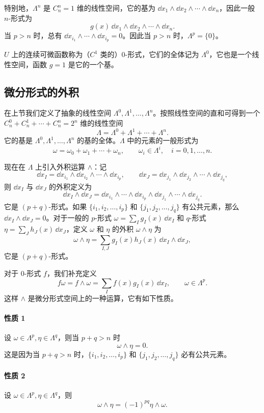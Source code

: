 特别地，$\Lambda^n$ 是 $C_n^n=1$ 维的线性空间，它的基为 $\dd x_1\wedge\dd x_2\wedge\cdots\wedge\dd x_n$，因此一般 $n$-形式为
\[
  g(x)\,\dd x_1\wedge\dd x_2\wedge\cdots\wedge\dd x_n.
\]
当 $p>n$ 时，总有 $\dd x_{i_1}\wedge\cdots\wedge\dd x_{i_p}=0$。因此当 $p>n$ 时，$\Lambda^p=\{0\}$。

$U$ 上的连续可微函数称为（$C^1$ 类的）0-形式，它们的全体记为 $\Lambda^0$，它也是一个线性空间，函数 $g=1$ 是它的一个基。

\subsection{微分形式的外积}

在上节我们定义了抽象的线性空间 $\Lambda^0,\Lambda^1,\ldots,\Lambda^n$。按照线性空间的直和可得到一个 $C_n^0+C_n^1+\cdots+C_n^n=2^n$ 维的线性空间
\[
  \Lambda=\Lambda^0+\Lambda^1+\cdots+\Lambda^n.
\]
它的基是 $\Lambda^0,\Lambda^1,\ldots,\Lambda^n$ 的基的全体。$\Lambda$ 中的元素的一般形式为
\[
  \omega=\omega_0+\omega_1+\cdots+\omega_n,
  \qquad \omega_i\in\Lambda^i,\quad i=0,1,\ldots,n.
\]

现在在 $\Lambda$ 上引入外积运算 $\wedge$：记
\[
  \dd x_I=\dd x_{i_1}\wedge\dd x_{i_2}\wedge\cdots\wedge\dd x_{i_p},\qquad
  \dd x_J=\dd x_{j_1}\wedge\dd x_{j_2}\wedge\cdots\wedge\dd x_{j_q},
\]
则 $\dd x_I$ 与 $\dd x_J$ 的外积定义为
\[
  \dd x_I\wedge\dd x_J
  =\dd x_{i_1}\wedge\cdots\wedge\dd x_{i_p}\wedge
  \dd x_{j_1}\wedge\cdots\wedge\dd x_{j_q}.
\]
它是 $(p+q)$-形式。如果 $\{i_1,i_2,\ldots,i_p\}$ 和 $\{j_1,j_2,\ldots,j_q\}$ 有公共元素，那么 $\dd x_I\wedge\dd x_J=0$。对于一般的 $p$-形式 $\omega=\sum_Ig_I(x)\,\dd x_I$ 和 $q$-形式 $\eta=\sum_Jh_J(x)\,\dd x_J$，定义 $\omega$ 和 $\eta$ 的外积 $\omega\wedge\eta$ 为
\[
  \omega\wedge\eta=\sum_{I,J}g_I(x)h_J(x)\,\dd x_I\wedge\dd x_J,
\]
它是 $(p+q)$-形式。

对于 0-形式 $f$，我们补充定义
\[
  f\omega=f\wedge\omega=\sum_I f(x)g_I(x)\,\dd x_I,\qquad\omega\in\Lambda^p.
\]
这样 $\wedge$ 是微分形式空间上的一种运算，它有如下性质。

\paragraph{性质 1}
设 $\omega\in\Lambda^p,\eta\in\Lambda^q$，则当 $p+q>n$ 时
\[
  \omega\wedge\eta=0.
\]
这是因为当 $p+q>n$ 时，$\{i_1,i_2,\ldots,i_p\}$ 和 $\{j_1,j_2,\ldots,j_q\}$ 必有公共元素。

\paragraph{性质 2}
设 $\omega\in\Lambda^p,\eta\in\Lambda^q$，则
\[
  \omega\wedge\eta=(-1)^{pq}\eta\wedge\omega.
\]

